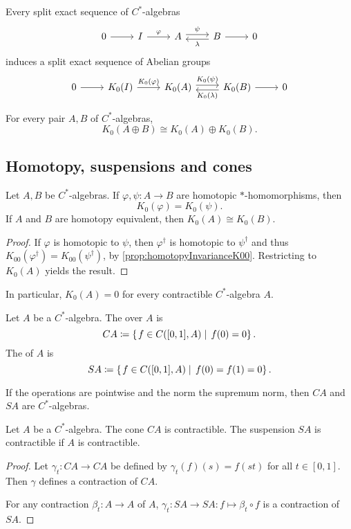 \begin{proposition}
Every split exact sequence of $C^*$-algebras
\[ \begin{tikzcd}
0 \rar & I \rar{\varphi} & A \rar[shift left]{\psi} & B \rar \lar[shift left]{\lambda} & 0
\end{tikzcd} \]
induces a split exact sequence of Abelian groups
\[ \begin{tikzcd}
0 \rar & K_0(I) \rar{K_0(\varphi)} & K_0(A) \rar[shift left]{K_0(\psi)} & K_0(B) \rar \lar[shift left]{K_0(\lambda)} & 0
\end{tikzcd} \]
\end{proposition}

\begin{proposition}
For every pair $A,B$ of $C^*$-algebras,
\[ K_0(A\oplus B) \cong K_0(A)\oplus K_0(B).  \]
\end{proposition}

\subsection{Homotopy, suspensions and cones}
\begin{proposition}
Let $A,B$ be $C^*$-algebras. If $\varphi,\psi:A\to B$ are homotopic $*$-homomorphisms, then 
\[ K_{0}(\varphi) = K_{0}(\psi). \]
If $A$ and $B$ are homotopy equivalent, then $K_{0}(A)\cong K_{0}(B)$.
\end{proposition}
\begin{proof}
If $\varphi$ is homotopic to $\psi$, then $\varphi^\dagger$ is homotopic to $\psi^\dagger$ and thus $K_{00}(\varphi^\dagger) = K_{00}(\psi^\dagger)$, by \ref{prop:homotopyInvarianceK00}. Restricting to $K_0(A)$ yields the result.
\end{proof}
In particular, $K_0(A) = 0$ for every contractible $C^*$-algebra $A$.

\begin{definition}
Let $A$ be a $C^*$-algebra. The  over $A$ is
\[ CA \coloneqq \left\{\left. f\in C([0,1], A) \;\right|\; f(0) = 0 \right\}. \]
The  of $A$ is
\[ SA \coloneqq \left\{\left. f\in C([0,1], A) \;\right|\; f(0) = f(1) = 0 \right\}. \]
\end{definition}

\begin{lemma}
If the operations are pointwise and the norm the supremum norm, then $CA$ and $SA$ are $C^*$-algebras.
\end{lemma}

\begin{lemma}
Let $A$ be a $C^*$-algebra. The cone $CA$ is contractible. The suspension $SA$ is contractible if $A$ is contractible.
\end{lemma}
\begin{proof}
Let $\gamma_t: CA\to CA$ be defined by $\gamma_t(f)(s) = f(st)$ for all $t\in [0,1]$. Then $\gamma$ defines a contraction of $CA$.

For any contraction $\beta_t: A\to A$ of $A$, $\gamma_t: SA \to SA: f\mapsto \beta_t\circ f$ is a contraction of $SA$.
\end{proof}

